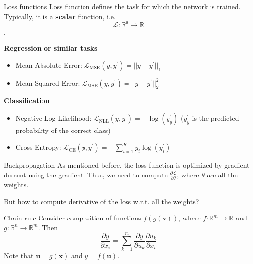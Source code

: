 \documentclass{beamer}
\begin{document}
\begin{frame}{Loss functions}
    Loss function defines the task for which the network is trained.
    Typically, it is a \textbf{scalar} function, i.e. $$\mathcal{L}: \mathbb{R}^n \rightarrow \mathbb{R}$$.

    \vfill

    \textbf{Regression or similar tasks}
    \begin{itemize}
        \item Mean Absolute Error: $\mathcal{L}_{\text{MSE}}(y, y^{\prime}) = ||y - y^{\prime}||_1$
        \item Mean Squared Error: $\mathcal{L}_{\text{MSE}}(y, y^{\prime}) = ||y - y^{\prime}||_2^2$
    \end{itemize}

    \textbf{Classification}
    \begin{itemize}
        \item Negative Log-Likelihood: $\mathcal{L}_{\text{NLL}}(y, y^{\prime}) = -\log(y^{\prime}_y)$ ($y^{\prime}_y$ is the predicted probability of the correct class)
        \item Cross-Entropy: $\mathcal{L}_{\text{CE}}(y, y^{\prime}) = -\sum_{i=1}^{K} y_i \log(y^{\prime}_i)$
    \end{itemize}
\end{frame}

\begin{frame}{Backpropagation}
    As mentioned before, the loss function is optimized by gradient descent using the gradient.
    Thus, we need to compute $\frac{\partial \mathcal{L}}{\partial \theta}$, where $\theta$ are all the weights.

    But how to compute derivative of the loss w.r.t. all the weights?
    \begin{block}{Chain rule}
        Consider composition of functions $f(g(\boldsymbol{x}))$, where $f: \mathbb{R}^m \to \mathbb{R}$ and $g: \mathbb{R}^n \to \mathbb{R}^m$. Then
        $$
            \frac{\partial y}{\partial x_i} = \sum_{k=1}^{m} \frac{\partial y}{\partial u_k} \frac{\partial u_k}{\partial x_i}
        $$
        Note that $\boldsymbol{u} = g(\boldsymbol{x})$ and $y = f(\boldsymbol{u})$.
    \end{block}
\end{frame}
\end{document}
